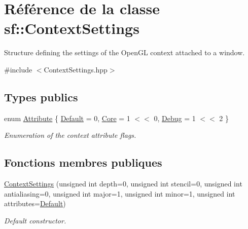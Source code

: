 \hypertarget{structsf_1_1ContextSettings}{}\section{Référence de la classe sf\+:\+:Context\+Settings}
\label{structsf_1_1ContextSettings}


Structure defining the settings of the Open\+GL context attached to a window.  




{\ttfamily \#include $<$Context\+Settings.\+hpp$>$}

\subsection*{Types publics}
\begin{DoxyCompactItemize}
\item 
enum \hyperlink{structsf_1_1ContextSettings_af2e91e57e8d26c40afe2ec8efaa32a2c}{Attribute} \{ \hyperlink{structsf_1_1ContextSettings_af2e91e57e8d26c40afe2ec8efaa32a2cabf868dcb751b909bf031484ed42a93bb}{Default} = 0, 
\hyperlink{structsf_1_1ContextSettings_af2e91e57e8d26c40afe2ec8efaa32a2cacb581130734cbd87cbbc9438429f4a8b}{Core} = 1 $<$$<$ 0, 
\hyperlink{structsf_1_1ContextSettings_af2e91e57e8d26c40afe2ec8efaa32a2ca6043f67afb3d48918d5336474eabaafc}{Debug} = 1 $<$$<$ 2
 \}\begin{DoxyCompactList}\small\item\em Enumeration of the context attribute flags. \end{DoxyCompactList}
\end{DoxyCompactItemize}
\subsection*{Fonctions membres publiques}
\begin{DoxyCompactItemize}
\item 
\hyperlink{structsf_1_1ContextSettings_aa0174eb022a15d951837297fba753186}{Context\+Settings} (unsigned int depth=0, unsigned int stencil=0, unsigned int antialiasing=0, unsigned int major=1, unsigned int minor=1, unsigned int attributes=\hyperlink{structsf_1_1ContextSettings_af2e91e57e8d26c40afe2ec8efaa32a2cabf868dcb751b909bf031484ed42a93bb}{Default})
\begin{DoxyCompactList}\small\item\em Default constructor. \end{DoxyCompactList}\end{DoxyCompactItemize}
